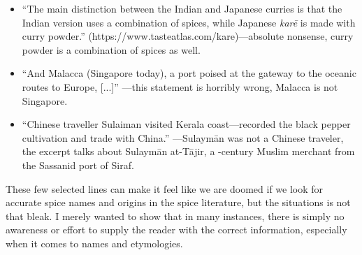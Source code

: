 \begin{itemize}
    \item ``The main distinction between the Indian and Japanese curries is that the Indian version uses a combination of spices, while Japanese \textit{karē} is made with curry powder.'' (https://www.tasteatlas.com/kare)---absolute nonsense, curry powder is a combination of spices as well.
    \item ``And Malacca (Singapore today), a port poised at the gateway to the oceanic routes to Europe, [...]'' \autocite[vi]{hill_contemporary_2004}---this statement is horribly wrong, Malacca is not Singapore.
    \item ``Chinese traveller Sulaiman visited Kerala coast—recorded the black pepper cultivation and trade with China.'' \autocite[3]{ravindran_black_2000}---Sulaymān was not a Chinese traveler, the excerpt talks about Sulaymān at-Tājir, a -century Muslim merchant from the Sassanid port of Siraf.
\end{itemize}





These few selected lines can make it feel like we are doomed if we look for accurate spice names and origins in the spice literature, but the situations is not that bleak. I merely wanted to show that in many instances, there is simply no awareness or effort to supply the reader with the correct information, especially when it comes to names and etymologies.

